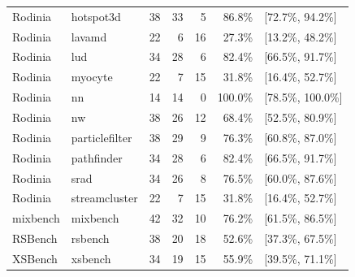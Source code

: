 \begin{table}[!htbp]
\begin{tabular}{@{}llrrrrl@{}}
Rodinia & hotspot3d & 38 & 33 & 5 & 86.8\% & [72.7\%, 94.2\%] \\
Rodinia & lavamd & 22 & 6 & 16 & 27.3\% & [13.2\%, 48.2\%] \\
Rodinia & lud & 34 & 28 & 6 & 82.4\% & [66.5\%, 91.7\%] \\
Rodinia & myocyte & 22 & 7 & 15 & 31.8\% & [16.4\%, 52.7\%] \\
Rodinia & nn & 14 & 14 & 0 & 100.0\% & [78.5\%, 100.0\%] \\
Rodinia & nw & 38 & 26 & 12 & 68.4\% & [52.5\%, 80.9\%] \\
Rodinia & particlefilter & 38 & 29 & 9 & 76.3\% & [60.8\%, 87.0\%] \\
Rodinia & pathfinder & 34 & 28 & 6 & 82.4\% & [66.5\%, 91.7\%] \\
Rodinia & srad & 34 & 26 & 8 & 76.5\% & [60.0\%, 87.6\%] \\
Rodinia & streamcluster & 22 & 7 & 15 & 31.8\% & [16.4\%, 52.7\%] \\
\midrule
mixbench & mixbench & 42 & 32 & 10 & 76.2\% & [61.5\%, 86.5\%] \\
RSBench & rsbench & 38 & 20 & 18 & 52.6\% & [37.3\%, 67.5\%] \\
XSBench & xsbench & 34 & 19 & 15 & 55.9\% & [39.5\%, 71.1\%] \\
\bottomrule
\end{tabular}
\end{table}

\newpage
\clearpage

